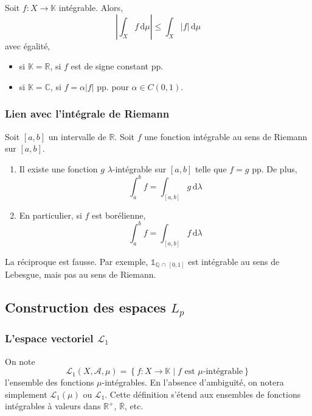 	\begin{proposition}
		Soit $f : X \rightarrow \mathbb{K}$ intégrable. Alors,
		\[ \left\vert \int_X f \, \mathrm{d}\mu \right\vert \leq \int_X \vert f \vert \, \mathrm{d}\mu \]
		avec égalité,
		\begin{itemize}
			\item si $\mathbb{K} = \mathbb{R}$, si $f$ est de signe constant pp.
			\item si $\mathbb{K} = \mathbb{C}$, si $f = \alpha \vert f \vert$ pp. pour $\alpha \in C(0,1)$.
		\end{itemize}
	\end{proposition}

	\subsubsection{Lien avec l'intégrale de Riemann}

	\begin{proposition}
		Soit $[a,b]$ un intervalle de $\mathbb{R}$. Soit $f$ une fonction intégrable au sens de Riemann sur $[a,b]$.
		\begin{enumerate}[label=(\roman*)]
			\item Il existe une fonction $g$ $\lambda$-intégrable sur $[a,b]$ telle que $f = g$ pp. De plus,
			\[ \int_a^b f = \int_{[a,b]} g \, \mathrm{d}\lambda \]
			\item En particulier, si $f$ est borélienne,
			\[ \int_a^b f = \int_{[a,b]} f \, \mathrm{d}\lambda \]
		\end{enumerate}
	\end{proposition}

	\begin{cexample}
		La réciproque est fausse. Par exemple, $\mathbb{1}_{\mathbb{Q} \, \cap \, [0,1]}$ est intégrable au sens de Lebesgue, mais pas au sens de Riemann.
	\end{cexample}

	\subsection{Construction des espaces \texorpdfstring{$L_p$}{Lₚ}}

	\subsubsection{L'espace vectoriel \texorpdfstring{$\mathcal{L}_1$}{L₁}}

	\begin{definition}
		\label{234-1}
		On note
		\[ \mathcal{L}_1(X, \mathcal{A}, \mu) = \left\{ f : X \rightarrow \mathbb{K} \mid f \text{ est } \mu\text{-intégrable} \right\} \]
		l'ensemble des fonctions $\mu$-intégrables. En l'absence d'ambiguïté, on notera simplement $\mathcal{L}_1(\mu)$ ou $\mathcal{L}_1$. Cette définition s'étend aux ensembles de fonctions intégrables à valeurs dans $\mathbb{R}^+$, $\overline{\mathbb{R}}$, etc.
	\end{definition}

